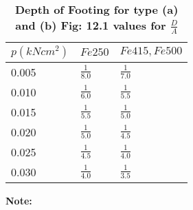 \documentclass{book}
\begin{document}
\begin{table}[h!]
\centering
\label{\textbf{Table 12.1}}
\caption{\textbf{Depth of Footing for type (a) and (b) Fig: 12.1 values for $\frac{D}{A}$}}
\begin{tabular}{ |p{3cm}||p{3cm}|p{3cm}|}
 \hline
 $p(kN cm^2)$ & $Fe 250$ & $Fe 415, Fe 500$\\[0.8 ex]
 \hline
 0.005 &$\frac{1}{8.0}$ &$\frac{1}{7.0}$\\[0.5 ex]
 0.010 &$\frac{1}{6.0}$ &$\frac{1}{5.5}$\\[0.5 ex]
 0.015&$\frac{1}{5.5}$ &$\frac{1}{5.0}$\\[0.5 ex]
 0.020 &$\frac{1}{5.0}$ &$\frac{1}{4.5}$\\[0.5 ex]
 0.025 &$\frac{1}{4.5}$ &$\frac{1}{4.0}$\\[0.5 ex]
 0.030 &$\frac{1}{4.0}$ &$\frac{1}{3.5}$\\[2 ex]
 \hline
  \end{tabular}
\end{table}
\textbf{Note:}
\end{document}
